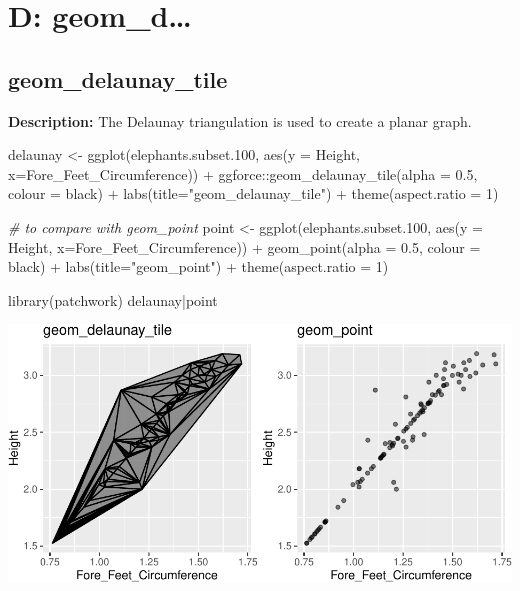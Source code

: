 \documentclass[
]{book}
\newenvironment{Shaded}{\begin{snugshade}}{\end{snugshade}}
\newcommand{\AttributeTok}[1]{\textcolor[rgb]{0.77,0.63,0.00}{#1}}
\newcommand{\CommentTok}[1]{\textcolor[rgb]{0.56,0.35,0.01}{\textit{#1}}}
\newcommand{\DecValTok}[1]{\textcolor[rgb]{0.00,0.00,0.81}{#1}}
\newcommand{\FloatTok}[1]{\textcolor[rgb]{0.00,0.00,0.81}{#1}}
\newcommand{\FunctionTok}[1]{\textcolor[rgb]{0.00,0.00,0.00}{#1}}
\newcommand{\NormalTok}[1]{#1}
\newcommand{\OtherTok}[1]{\textcolor[rgb]{0.56,0.35,0.01}{#1}}
\newcommand{\SpecialCharTok}[1]{\textcolor[rgb]{0.00,0.00,0.00}{#1}}
\newcommand{\StringTok}[1]{\textcolor[rgb]{0.31,0.60,0.02}{#1}}
\begin{document}
\hypertarget{d-geom_d}{%
\chapter{D: geom\_d\ldots{}}\label{d-geom_d}}

\hypertarget{geom_delaunay_tile}{%
\section{geom\_delaunay\_tile}\label{geom_delaunay_tile}}

\textbf{Description:} The Delaunay triangulation is used to create a planar graph.

\begin{Shaded}
\begin{Highlighting}[]
\NormalTok{delaunay }\OtherTok{\textless{}{-}} \FunctionTok{ggplot}\NormalTok{(elephants.subset}\FloatTok{.100}\NormalTok{, }\FunctionTok{aes}\NormalTok{(}\AttributeTok{y =}\NormalTok{ Height, }\AttributeTok{x=}\NormalTok{Fore\_Feet\_Circumference)) }\SpecialCharTok{+}
\NormalTok{  ggforce}\SpecialCharTok{::}\FunctionTok{geom\_delaunay\_tile}\NormalTok{(}\AttributeTok{alpha =} \FloatTok{0.5}\NormalTok{, }\AttributeTok{colour =} \StringTok{\textquotesingle{}black\textquotesingle{}}\NormalTok{) }\SpecialCharTok{+} \FunctionTok{labs}\NormalTok{(}\AttributeTok{title=}\StringTok{"geom\_delaunay\_tile"}\NormalTok{) }\SpecialCharTok{+} \FunctionTok{theme}\NormalTok{(}\AttributeTok{aspect.ratio =} \DecValTok{1}\NormalTok{)}

\CommentTok{\# to compare with geom\_point}
\NormalTok{point }\OtherTok{\textless{}{-}} \FunctionTok{ggplot}\NormalTok{(elephants.subset}\FloatTok{.100}\NormalTok{, }\FunctionTok{aes}\NormalTok{(}\AttributeTok{y =}\NormalTok{ Height, }\AttributeTok{x=}\NormalTok{Fore\_Feet\_Circumference)) }\SpecialCharTok{+}
  \FunctionTok{geom\_point}\NormalTok{(}\AttributeTok{alpha =} \FloatTok{0.5}\NormalTok{, }\AttributeTok{colour =} \StringTok{\textquotesingle{}black\textquotesingle{}}\NormalTok{) }\SpecialCharTok{+} \FunctionTok{labs}\NormalTok{(}\AttributeTok{title=}\StringTok{"geom\_point"}\NormalTok{) }\SpecialCharTok{+} \FunctionTok{theme}\NormalTok{(}\AttributeTok{aspect.ratio =} \DecValTok{1}\NormalTok{)}

\FunctionTok{library}\NormalTok{(patchwork)}
\NormalTok{delaunay}\SpecialCharTok{|}\NormalTok{point}
\end{Highlighting}
\end{Shaded}

\includegraphics{Data-Visualisation-geom-Encyclopedia_files/figure-latex/unnamed-chunk-30-1.pdf}
\end{document}
